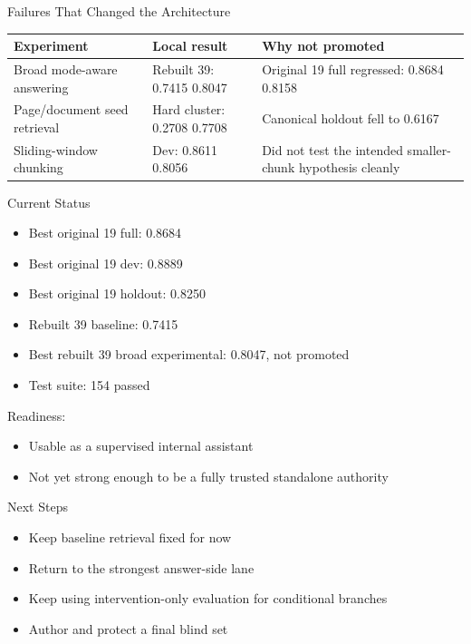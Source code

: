 \documentclass[aspectratio=169]{beamer}
\begin{document}
\begin{frame}{Failures That Changed the Architecture}
  \begin{tabularx}{\textwidth}{>{\raggedright\arraybackslash}p{} >{\raggedright\arraybackslash}p{} >{\raggedright\arraybackslash}X}
    \toprule
    Experiment & Local result & Why not promoted \\
    \midrule
    Broad mode-aware answering & Rebuilt 39: 0.7415 \textrightarrow{} 0.8047 & Original 19 full regressed: 0.8684 \textrightarrow{} 0.8158 \\
    Page/document seed retrieval & Hard cluster: 0.2708 \textrightarrow{} 0.7708 & Canonical holdout fell to 0.6167 \\
    Sliding-window chunking & Dev: 0.8611 \textrightarrow{} 0.8056 & Did not test the intended smaller-chunk hypothesis cleanly \\
    \bottomrule
  \end{tabularx}
\end{frame}

\begin{frame}{Current Status}
  \begin{itemize}
    \item Best original 19 full: 0.8684
    \item Best original 19 dev: 0.8889
    \item Best original 19 holdout: 0.8250
    \item Rebuilt 39 baseline: 0.7415
    \item Best rebuilt 39 broad experimental: 0.8047, not promoted
    \item Test suite: 154 passed
  \end{itemize}

  \vspace{0.5em}
  Readiness:
  \begin{itemize}
    \item Usable as a supervised internal assistant
    \item Not yet strong enough to be a fully trusted standalone authority
  \end{itemize}
\end{frame}

\begin{frame}{Next Steps}
  \begin{itemize}
    \item Keep baseline retrieval fixed for now
    \item Return to the strongest answer-side lane
    \item Keep using intervention-only evaluation for conditional branches
    \item Author and protect a final blind set
  \end{itemize}
\end{frame}
\end{document}
